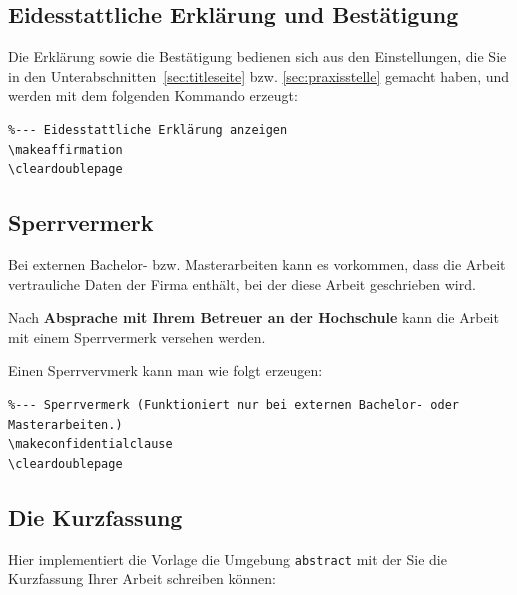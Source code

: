 \documentclass[pdftex,a4paper]{scrartcl}
\begin{document}

\subsection{Eidesstattliche Erklärung und Bestätigung}

Die Erklärung sowie die Bestätigung bedienen sich aus den Einstellungen,
die Sie in den Unterabschnitten~\ref{sec:titleseite} bzw. \ref{sec:praxisstelle}
gemacht haben, und werden mit dem folgenden Kommando erzeugt:

\begin{verbatim}
%--- Eidesstattliche Erklärung anzeigen
\makeaffirmation
\cleardoublepage
\end{verbatim}

\subsection{Sperrvermerk}

Bei externen Bachelor- bzw. Masterarbeiten kann es vorkommen, dass die Arbeit
vertrauliche Daten der Firma enthält, bei der diese Arbeit geschrieben wird.

Nach \textbf{Absprache mit Ihrem Betreuer an der Hochschule} kann die Arbeit
mit einem Sperrvermerk versehen werden. 


Einen Sperrvervmerk kann man wie folgt erzeugen:

\begin{verbatim}
%--- Sperrvermerk (Funktioniert nur bei externen Bachelor- oder Masterarbeiten.)
\makeconfidentialclause
\cleardoublepage
\end{verbatim}


\subsection{Die Kurzfassung}

Hier implementiert die Vorlage die Umgebung \verb+abstract+ mit der Sie die Kurzfassung Ihrer Arbeit schreiben können:
\end{document}

